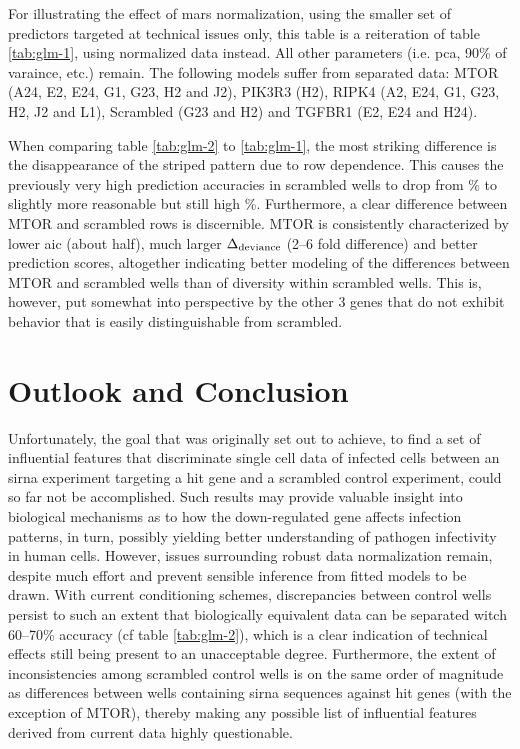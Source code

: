 \renewcommand{\arraystretch}{1.5}
\setlength{\tabcolsep}{0.25em}
\begin{table}
  \centering
  \caption[Reiteration of table \ref{tab:glm-1}, using normalized features for \gls{glm} fitting.]{For illustrating the effect of \gls{mars} normalization, using the smaller set of predictors targeted at technical issues only, this table is a reiteration of table \ref{tab:glm-1}, using normalized data instead. All other parameters (i.e. \gls{pca}, 90\% of varaince, etc.) remain. The following models suffer from separated data: MTOR (A24, E2, E24, G1, G23, H2 and J2), PIK3R3 (H2), RIPK4 (A2, E24, G1, G23, H2, J2 and L1), Scrambled (G23 and H2) and TGFBR1 (E2, E24 and H24).}
  \label{tab:glm-2}
  \footnotesize
  \vspace{5px}
  
\end{table}

When comparing table \ref{tab:glm-2} to  \ref{tab:glm-1}, the most striking difference is the disappearance of the striped pattern due to row dependence. This causes the previously very high prediction accuracies in scrambled wells to drop from \% to slightly more reasonable but still high \%. Furthermore, a clear difference between MTOR and scrambled rows is discernible. MTOR is consistently characterized by lower \gls{aic} (about half), much larger $\Delta\textsubscript{deviance}$ (2--6 fold difference) and better prediction scores, altogether indicating better modeling of the differences between MTOR and scrambled wells than of diversity within scrambled wells. This is, however, put somewhat into perspective by the other 3 genes that do not exhibit behavior that is easily distinguishable from scrambled.

\section{Outlook and Conclusion}
Unfortunately, the goal that was originally set out to achieve, to find a set of influential features that discriminate single cell data of infected cells between an \gls{sirna} experiment targeting a hit gene and a scrambled control experiment, could so far not be accomplished. Such results may provide valuable insight into biological mechanisms as to how the down-regulated gene affects infection patterns, in turn, possibly yielding better understanding of pathogen infectivity in human cells. However, issues surrounding robust data normalization remain, despite much effort and prevent sensible inference from fitted models to be drawn. With current conditioning schemes, discrepancies between control wells persist to such an extent that biologically equivalent data can be separated witch 60--70\% accuracy (cf table \ref{tab:glm-2}), which is a clear indication of technical effects still being present to an unacceptable degree. Furthermore, the extent of inconsistencies among scrambled control wells is on the same order of magnitude as differences between wells containing \gls{sirna} sequences against hit genes (with the exception of MTOR), thereby making any possible list of influential features derived from current data highly questionable.

